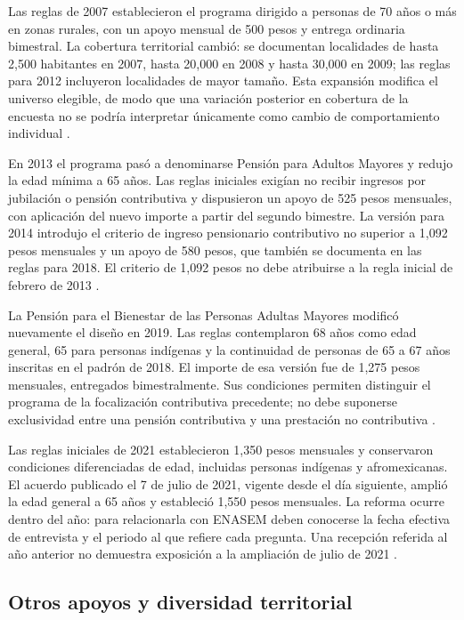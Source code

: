 Las reglas de 2007 establecieron el programa dirigido a personas de 70 años o
más en zonas rurales, con un apoyo mensual de 500 pesos y entrega ordinaria
bimestral. La cobertura territorial cambió: se documentan localidades de hasta
2,500 habitantes en 2007, hasta 20,000 en 2008 y hasta 30,000 en 2009; las reglas
para 2012 incluyeron localidades de mayor tamaño. Esta expansión modifica el
universo elegible, de modo que una variación posterior en cobertura de la
encuesta no se podría interpretar únicamente como cambio de comportamiento
individual \citep{setentamas2007,coneval2008mayores,setentamas2009,setentamas2012}.

En 2013 el programa pasó a denominarse Pensión para Adultos Mayores y redujo
la edad mínima a 65 años. Las reglas iniciales exigían no recibir ingresos por
jubilación o pensión contributiva y dispusieron un apoyo de 525 pesos mensuales,
con aplicación del nuevo importe a partir del segundo bimestre. La versión
para 2014 introdujo el criterio de ingreso pensionario contributivo no superior
a 1,092 pesos mensuales y un apoyo de 580 pesos, que también se documenta en
las reglas para 2018. El criterio de 1,092 pesos no debe atribuirse a la regla
inicial de febrero de 2013 \citep{pam2013,pam2014,pam2018}.

La Pensión para el Bienestar de las Personas Adultas Mayores modificó nuevamente
el diseño en 2019. Las reglas contemplaron 68 años como edad general, 65 para
personas indígenas y la continuidad de personas de 65 a 67 años inscritas en
el padrón de 2018. El importe de esa versión fue de 1,275 pesos mensuales,
entregados bimestralmente. Sus condiciones permiten distinguir el programa de
la focalización contributiva precedente; no debe suponerse exclusividad entre
una pensión contributiva y una prestación no contributiva \citep{bienestar2019}.

Las reglas iniciales de 2021 establecieron 1,350 pesos mensuales y conservaron
condiciones diferenciadas de edad, incluidas personas indígenas y afromexicanas.
El acuerdo publicado el 7 de julio de 2021, vigente desde el día siguiente,
amplió la edad general a 65 años y estableció 1,550 pesos mensuales. La reforma
ocurre dentro del año: para relacionarla con ENASEM deben conocerse la fecha
efectiva de entrevista y el periodo al que refiere cada pregunta. Una recepción
referida al año anterior no demuestra exposición a la ampliación de julio de
2021 \citep{bienestar2021a,bienestar2021b}.


\subsection{Otros apoyos y diversidad territorial}

